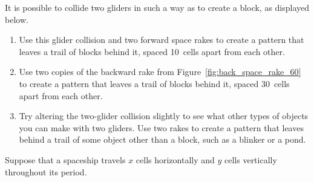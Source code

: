 \begin{multicols}{2}
	
	\mfilbreak
	
	
	\begin{problem}\label{exer:space_rake_make_things} 
		It is possible to collide two gliders in such a way as to create a block, as displayed below.
		
		\begin{center}
		\end{center}
		\begin{enumerate}[label=\bf\color{ocre}(\alph*)]
			\item Use this glider collision and two forward space rakes to create a pattern that leaves a trail of blocks behind it, spaced 10~cells apart from each other.
			
			\item Use two copies of the backward rake from Figure~\ref{fig:back_space_rake_60} to create a pattern that leaves a trail of blocks behind it, spaced 30~cells apart from each other.
			
			\item Try altering the two-glider collision slightly to see what other types of objects you can make with two gliders. Use two rakes to create a pattern that leaves behind a trail of some object other than a block, such as a blinker or a pond.
%
		\end{enumerate}
	\end{problem}
	
	
	\mfilbreak
	
	
	\begin{problem}\label{exer:general_speed_limit} 
		Suppose that a spaceship travels $x$ cells horizontally and $y$ cells vertically throughout its period.\smallskip
		

\end{problem}
\end{multicols}
